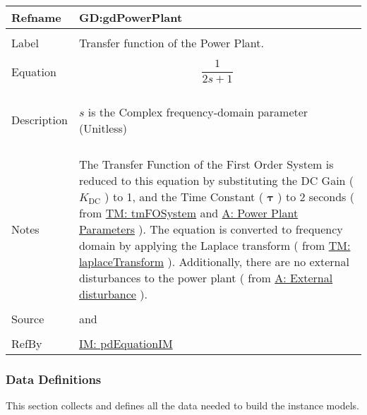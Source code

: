 \documentclass[12pt]{article}
\begin{document}
\vspace{\baselineskip}
\noindent
\begin{minipage}{\textwidth}
\begin{tabular}{>{\raggedright}p{}>{\raggedright\arraybackslash}p{}}
\toprule \textbf{Refname} & \textbf{GD:gdPowerPlant}
\label{GD:gdPowerPlant}
\\ \midrule \\
Label & Transfer function of the Power Plant.
        
\\ \midrule \\
Equation & \begin{displaymath}
           \frac{1}{2 s+1}
           \end{displaymath}
\\ \midrule \\
Description & \begin{symbDescription}
              \item{$s$ is the Complex frequency-domain parameter (Unitless)}
              \end{symbDescription}
\\ \midrule \\
Notes & The  Transfer Function of the First Order System is reduced to this equation by substituting the DC Gain ( ${K_{\text{DC}}}$ ) to 1, and the Time Constant ( $𝛕$ ) to 2 seconds ( from  \hyperref[TM:tmFOSystem]{TM: tmFOSystem} and \hyperref[dcGainTimeConst]{A: Power Plant Parameters} ). The equation is converted to frequency domain by applying the Laplace transform ( from \hyperref[TM:laplaceTransform]{TM: laplaceTransform} ). Additionally, there are no external disturbances to the power plant ( from  \hyperref[externalDistub]{A: External disturbance} ).
        
\\ \midrule \\
Source & \cite{pidWiki} and \cite{electrical4UWiki}
         
\\ \midrule \\
RefBy & \hyperref[IM:pdEquationIM]{IM: pdEquationIM}
        
\\ \bottomrule
\end{tabular}
\end{minipage}
\subsubsection{Data Definitions}
\label{Sec:DDs}
This section collects and defines all the data needed to build the instance models.
\end{document}
